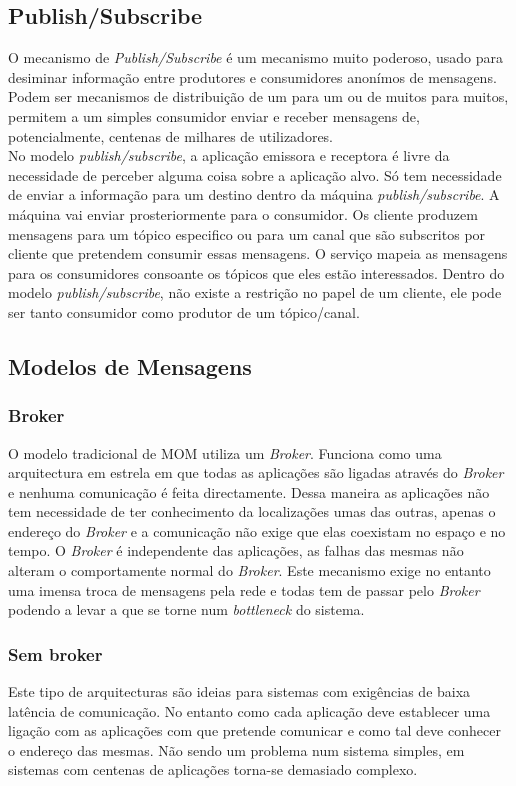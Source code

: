 \subsection{Publish/Subscribe}
O mecanismo  de \textit{Publish/Subscribe} é um mecanismo muito poderoso, usado para desiminar informação entre produtores e consumidores anonímos de mensagens. Podem ser mecanismos de distribuição de um para um ou de muitos para muitos, permitem a um simples consumidor enviar e receber mensagens de, potencialmente, centenas de milhares de utilizadores.\\
No modelo \textit{publish/subscribe}, a aplicação emissora e receptora é livre da necessidade de perceber alguma coisa sobre a aplicação alvo.  Só tem necessidade de enviar a informação para um destino dentro da máquina \textit{publish/subscribe}. A máquina vai enviar prosteriormente para o consumidor. Os cliente produzem mensagens para um tópico especifico ou para um canal que são subscritos por cliente que pretendem consumir essas mensagens. O serviço mapeia as mensagens para os consumidores consoante os tópicos que eles estão interessados. Dentro do modelo \textit{publish/subscribe}, não existe a restrição no papel de um cliente, ele pode ser tanto consumidor como produtor de um tópico/canal.\\
\subsection{Modelos de Mensagens}
\subsubsection{Broker}
O modelo tradicional de MOM utiliza um \textit{Broker}. Funciona como uma arquitectura em estrela em que todas as aplicações são ligadas através do \textit{Broker} e nenhuma comunicação é feita directamente. Dessa maneira as aplicações não tem necessidade de ter conhecimento da localizações umas das outras, apenas o endereço do \textit{Broker} e a comunicação não exige que elas coexistam no espaço e no tempo. O \textit{Broker} é independente das aplicações, as falhas das mesmas não alteram o comportamente normal do \textit{Broker}. Este mecanismo exige no entanto uma imensa troca de mensagens pela rede e todas tem de passar pelo \textit{Broker} podendo a levar a que se torne num \textit{bottleneck} do sistema.\\
\subsubsection{Sem broker}
Este tipo de arquitecturas são ideias para sistemas com exigências de baixa latência de comunicação. No entanto como cada aplicação deve establecer uma ligação com as aplicações com que pretende comunicar e como tal deve conhecer o endereço das mesmas. Não sendo um problema num sistema simples, em sistemas com centenas de aplicações torna-se demasiado complexo.\\
